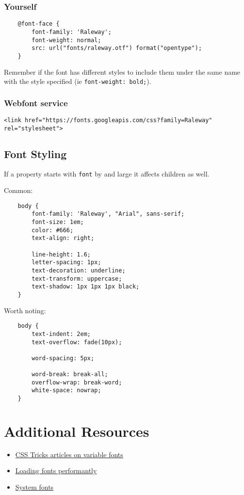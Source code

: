 \subsubsection{Yourself}

\begin{verbatim}
    @font-face {
        font-family: 'Raleway';
        font-weight: normal;
        src: url("fonts/raleway.otf") format("opentype");
    }
\end{verbatim}

Remember if the font has different styles to include them under the same name with the style specified (ie \texttt{font-weight: bold;}).

\subsubsection{Webfont service}

\begin{verbatim}
<link href="https://fonts.googleapis.com/css?family=Raleway" rel="stylesheet">
\end{verbatim}

\subsection{Font Styling}

If a property starts with \texttt{font} by and large it affects children as well.

Common:

\begin{verbatim}
    body {
        font-family: 'Raleway', "Arial", sans-serif;
        font-size: 1em;
        color: #666;
        text-align: right;

        line-height: 1.6;
        letter-spacing: 1px;
        text-decoration: underline;
        text-transform: uppercase;
        text-shadow: 1px 1px 1px black;
    }
\end{verbatim}

Worth noting:

\begin{verbatim}
    body {
        text-indent: 2em;
        text-overflow: fade(10px);

        word-spacing: 5px;

        word-break: break-all;
        overflow-wrap: break-word;
        white-space: nowrap;
    }
\end{verbatim}

\section{Additional Resources}

\begin{itemize}[leftmargin=*]
    \item \href{https://css-tricks.com/guides/opentype-variable-fonts/}{CSS Tricks articles on variable fonts}
    \item \href{https://css-tricks.com/fout-foit-foft/}{Loading fonts performantly}
    \item \href{https://css-tricks.com/snippets/css/system-font-stack/}{System fonts}
\end{itemize}
